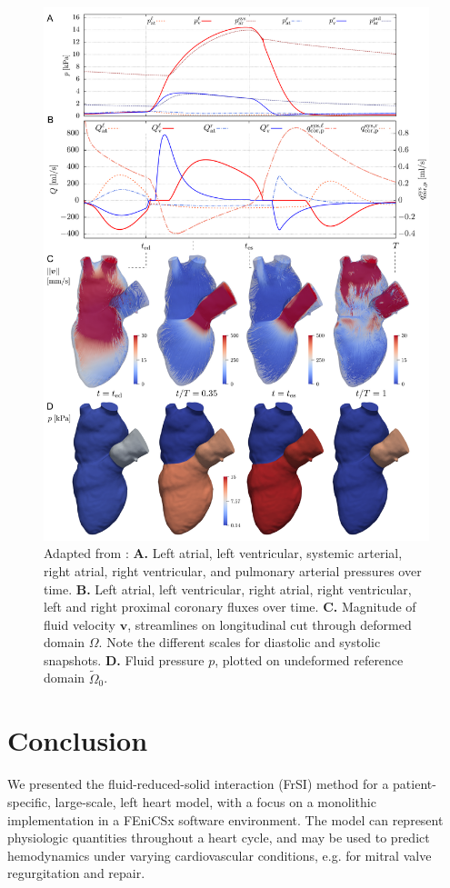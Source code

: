 \begin{figure}[!htp]
\centering
\includegraphics[width=1\textwidth]{chapters/hirschvogel/heart_results.pdf}
\caption{Adapted from \cite{hirschvogel2025-prec}: \textbf{A.} Left atrial, left ventricular, systemic arterial, right atrial, right ventricular, and pulmonary arterial pressures over time. \textbf{B.} Left atrial, left ventricular, right atrial, right ventricular, left and right proximal coronary fluxes over time. \textbf{C.} Magnitude of fluid velocity $\boldsymbol{v}$, streamlines on longitudinal cut through deformed domain $\mathit{\Omega}$. Note the different scales for diastolic and systolic snapshots. \textbf{D.} Fluid pressure $p$, plotted on undeformed reference domain $\tilde{\mathit{\Omega}}_{0}$.}\label{fig:heart_results}
\end{figure}

\section*{Conclusion}
We presented the fluid-reduced-solid interaction (FrSI) method for a patient-specific, large-scale, left heart model, with a focus on a monolithic implementation in a FEniCSx software environment. The model can represent physiologic quantities throughout a heart cycle, and may be used to predict hemodynamics under varying cardiovascular conditions, e.g. for mitral valve regurgitation and repair.

